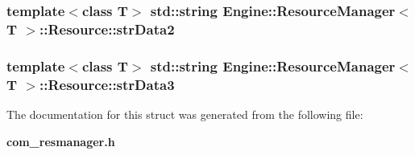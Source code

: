 \subsubsection{\setlength{\rightskip}{0pt plus 5cm}template$<$class T$>$ std::string {\bf Engine::ResourceManager}$<$ T $>$::{\bf Resource::strData2}}\label{structEngine_1_1ResourceManager_1_1Resource_22bb9c0f59bdd66645f173b55f9022e6}


\subsubsection{\setlength{\rightskip}{0pt plus 5cm}template$<$class T$>$ std::string {\bf Engine::ResourceManager}$<$ T $>$::{\bf Resource::strData3}}\label{structEngine_1_1ResourceManager_1_1Resource_a06558b8c2381df350c0ad20ac457dee}




The documentation for this struct was generated from the following file:\begin{CompactItemize}
\item 
{\bf com\_\-resmanager.h}\end{CompactItemize}
